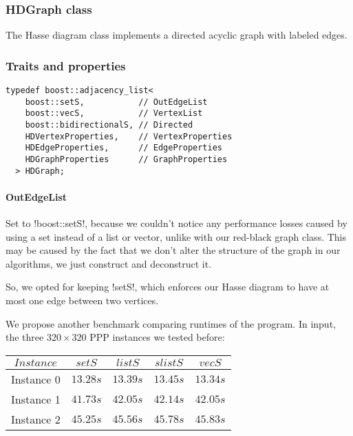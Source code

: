 \pagebreak

\subsubsection{HDGraph class}\label{section:hdgraph-class}

The Hasse diagram class implements a directed acyclic graph with labeled edges.

\subsubsection*{Traits and properties}


\begin{lstlisting}[belowskip=0pt]
  typedef boost::adjacency_list<
    boost::setS,           // OutEdgeList
    boost::vecS,           // VertexList
    boost::bidirectionalS, // Directed
    HDVertexProperties,    // VertexProperties
    HDEdgeProperties,      // EdgeProperties
    HDGraphProperties      // GraphProperties
  > HDGraph;
\end{lstlisting}

\paragraph{OutEdgeList}

Set to !boost::setS!, because we couldn't notice any performance losses caused by using a set instead of a list or vector, unlike with our red-black graph class.
This may be caused by the fact that we don't alter the structure of the graph in our algorithms, we just construct and deconstruct it.

So, we opted for keeping !setS!, which enforces our Hasse diagram to have at most one edge between two vertices.

We propose another benchmark comparing runtimes of the program.
In input, the three $320 \times 320$ PPP instances we tested before:

\begin{center}
  \begin{tabular}{c | c c c c}
    $Instance$ & $setS$   & $listS$  & $slistS$ & $vecS$ \\
    \hline
    Instance 0 & $13.28s$ & $13.39s$ & $13.45s$ & $13.34s$ \\
    Instance 1 & $41.73s$ & $42.05s$ & $42.14s$ & $42.05s$ \\
    Instance 2 & $45.25s$ & $45.56s$ & $45.78s$ & $45.83s$
  \end{tabular}
\end{center}

